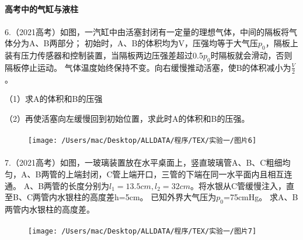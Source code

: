 \documentclass[UTF8]{ctexart}
\begin{document}
\paragraph{高考中的气缸与液柱}

\paragraph{}
    6.（2021高考）如图，一汽缸中由活塞封闭有一定量的理想气体，中间的隔板将气体分为A、B两部分；
    初始时，A、B的体积均为V，压强均等于大气压$p_{0}$，隔板上装有压力传感器和控制装置，当隔板两边压强差超过0.5$p_{0}$时隔板就会滑动，否则隔板停止运动。
    气体温度始终保持不变。向右缓慢推动活塞，使B的体积减小为$\frac{V}{2}$。

    （1）求A的体积和B的压强

    （2）再使活塞向左缓慢回到初始位置，求此时A的体积和B的压强。

\begin{figure}[htbp]
\paragraph{} \texttt{[image: /Users/mac/Desktop/ALLDATA/程序/TEX/实验一/图片6]}\label{fig:figure3}
\end{figure}

\paragraph{}
\paragraph{}
\paragraph{}
\paragraph{}


\paragraph{}
    7.（2021高考）如图，一玻璃装置放在水平桌面上，竖直玻璃管A、B、C粗细均匀，A、B两管的上端封闭，C管上端开口，三管的下端在同一水平面内且相互连通。
    A、B两管的长度分别为$l_{1}=13.5cm,l_{2}=32cm$。将水银从C管缓慢注入，直至B、C两管内水银柱的高度差h=5cm。
    已知外界大气压为$p_{0}$=75cmHg。
    求A、B两管内水银柱的高度差。

\begin{figure}[htbp]
\paragraph{} \texttt{[image: /Users/mac/Desktop/ALLDATA/程序/TEX/实验一/图片7]}\label{fig:figure4}
\end{figure}
\end{document}
